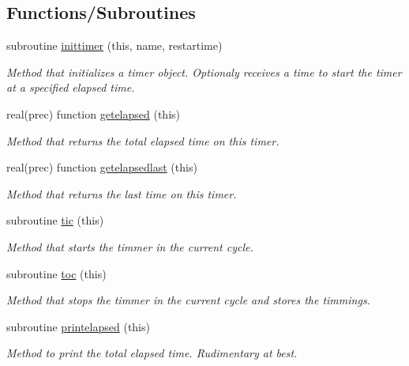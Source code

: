\subsection*{Functions/\+Subroutines}
\begin{DoxyCompactItemize}
\item 
subroutine \mbox{\hyperlink{namespacesimulationtimer__mod_a3e4c0de31b2db7da6c0c781c047a3743}{inittimer}} (this, name, restartime)
\begin{DoxyCompactList}\small\item\em Method that initializes a timer object. Optionaly receives a time to start the timer at a specified elapsed time. \end{DoxyCompactList}\item 
real(prec) function \mbox{\hyperlink{namespacesimulationtimer__mod_a54fa7688c279c747bd76554fb8adb819}{getelapsed}} (this)
\begin{DoxyCompactList}\small\item\em Method that returns the total elapsed time on this timer. \end{DoxyCompactList}\item 
real(prec) function \mbox{\hyperlink{namespacesimulationtimer__mod_a70cb936bfcb2754fa6f1fbe3e7a715a5}{getelapsedlast}} (this)
\begin{DoxyCompactList}\small\item\em Method that returns the last time on this timer. \end{DoxyCompactList}\item 
subroutine \mbox{\hyperlink{namespacesimulationtimer__mod_a0924f340c4f5785a5981bdc99226e576}{tic}} (this)
\begin{DoxyCompactList}\small\item\em Method that starts the timmer in the current cycle. \end{DoxyCompactList}\item 
subroutine \mbox{\hyperlink{namespacesimulationtimer__mod_ae5c4ca42de2cd1f446eee79112cedd14}{toc}} (this)
\begin{DoxyCompactList}\small\item\em Method that stops the timmer in the current cycle and stores the timmings. \end{DoxyCompactList}\item 
subroutine \mbox{\hyperlink{namespacesimulationtimer__mod_a9df6f995616d7fa53094178c3aff1fad}{printelapsed}} (this)
\begin{DoxyCompactList}\small\item\em Method to print the total elapsed time. Rudimentary at best. \end{DoxyCompactList}\item 

\end{DoxyCompactItemize}
